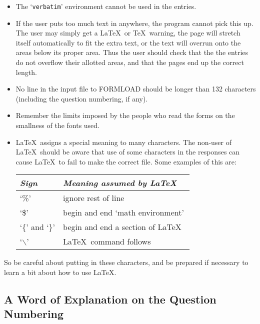 \begin{itemize}

\item The `{\tt verbatim}' environment cannot be used in the entries.

\item If the user puts too much text in anywhere, the program cannot pick
this up. The user may simply get a \LaTeX\ or \TeX\ warning, the page will
stretch itself automatically to fit the extra text, or the text will
overrun onto the areas below its proper area. Thus the user
should check that the the entries do not overflow their allotted areas, and
that the pages end up the correct length.

\item No line in the input file to FORMLOAD should be longer than 132
characters (including the question numbering, if any).

\item Remember the limits imposed by the people who read the forms on the
smallness of the fonts used.

\item \LaTeX\ assigns a special meaning to many characters. The non-user of
\LaTeX\  should be aware that use of some characters in the responses can
cause \LaTeX\ to fail to make the correct file. Some examples of this are:

\begin{center}
\begin{tabular}{|l|l|} \hline
  {\it Sign}     &  {\it Meaning assumed by \LaTeX\ } \\ \hline \hline
 `\%'            &  ignore rest of line \\ \hline
 `\$'            &  begin and end `math environment' \\ \hline
 `\{' and `\}'   &  begin and end a section of \LaTeX\ \\ \hline
 `$\backslash$'  &  \LaTeX\ command follows \\ \hline
\end{tabular}
\end{center}
\end{itemize}

So be careful about putting in these characters, and be prepared if
necessary to learn a bit about how to use \LaTeX .

\subsection{A Word of Explanation on the Question Numbering}

